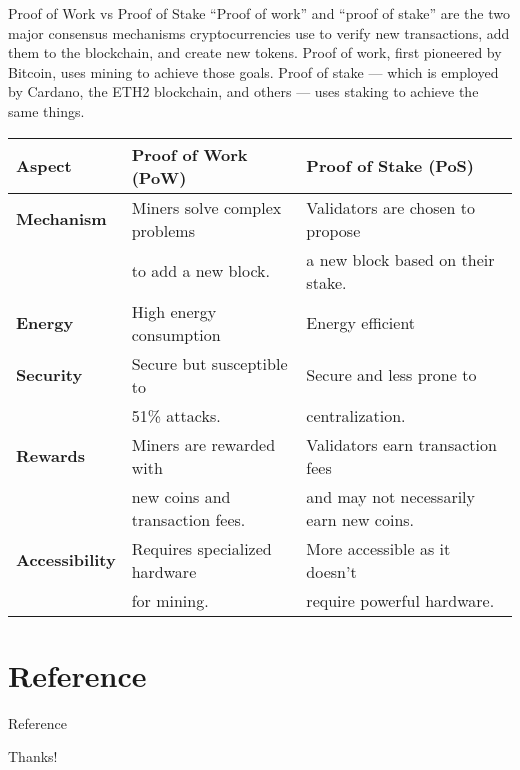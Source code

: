 \documentclass{beamer}
\newcommand{\redcalligra}[1]{{\color{red}\calligra #1}}
\begin{document}
\begin{frame}{Proof of Work vs Proof of Stake}
\scriptsize
“Proof of work” and “proof of stake” are the two major consensus mechanisms cryptocurrencies use to verify new transactions, add them to the blockchain, and create new tokens.  Proof of work, first pioneered by Bitcoin, uses mining to achieve those goals. Proof of stake — which is employed by Cardano, the ETH2 blockchain, and others — uses staking to achieve the same things. 
\begin{table}
\centering
\begin{tabular}{|l|l|l|}
\hline
\textbf{Aspect} & \textbf{Proof of Work (PoW)} & \textbf{Proof of Stake (PoS)} \\
\hline
\textbf{Mechanism} & Miners solve complex problems & Validators are chosen to propose \\
& to add a new block. & a new block based on their stake. \\
\hline
\textbf{Energy} & High energy consumption & Energy efficient \\
\hline
\textbf{Security} & Secure but susceptible to & Secure and less prone to \\
& 51\% attacks. & centralization. \\
\hline
\textbf{Rewards} & Miners are rewarded with & Validators earn transaction fees \\
& new coins and transaction fees. & and may not necessarily earn new coins. \\
\hline
\textbf{Accessibility} & Requires specialized hardware & More accessible as it doesn't \\
& for mining. & require powerful hardware. \\
\hline
\end{tabular}
\end{table}
\end{frame}


\section{Reference}
\begin{frame}[allowframebreaks]{Reference}
  \printbibliography
\end{frame}

\begin{frame}{ }

    \begin{center}
        \Huge \redcalligra{Thanks!}
    \end{center}
\end{frame}
\end{document}

